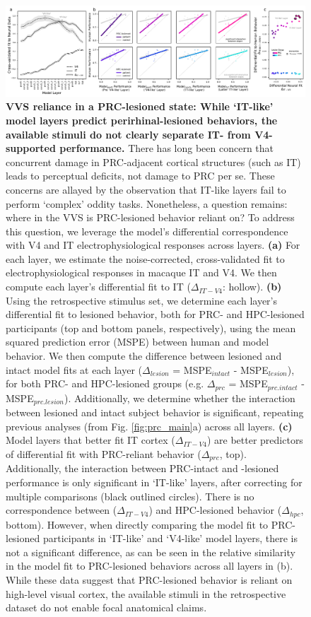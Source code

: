 \documentclass[11pt]{article}
\begin{document}
\begin{figure}[ht]
\centering
\includegraphics[width=\linewidth]{figures/VVSfit_metaanalysis}
\caption{\textbf{VVS reliance in a PRC-lesioned state: While `IT-like' model layers predict perirhinal-lesioned behaviors, the available stimuli do not clearly separate IT- from V4-supported performance.} There has long been concern that concurrent damage in PRC-adjacent cortical structures (such as IT) leads to perceptual deficits, not damage to PRC per se. These concerns are allayed by the observation that IT-like layers fail to perform `complex’ oddity tasks. Nonetheless, a question remains: where in the VVS is PRC-lesioned behavior reliant on? To address this question, we leverage the model's differential correspondence with V4 and IT electrophysiological responses across layers. \textbf{(a)} For each layer, we estimate the noise-corrected, cross-validated fit to electrophysiological responses in macaque IT and V4. We then compute each layer's differential fit to IT ($\Delta_{IT-V4}$: hollow). \textbf{(b)} Using the retrospective stimulus set, we determine each layer's differential fit to lesioned behavior, both for PRC- and HPC-lesioned participants (top and bottom panels, respectively), using the mean squared prediction error (MSPE) between human and model behavior. We then compute the difference between lesioned and intact model fits at each layer ($\Delta_{lesion}$ = MSPE$_{intact}$ - MSPE$_{lesion}$), for both PRC- and HPC-lesioned groups (e.g. $\Delta_{prc}$ = MSPE$_{prc.intact}$ - MSPE$_{prc.lesion}$). Additionally, we determine whether the interaction between lesioned and intact subject behavior is significant, repeating previous analyses (from Fig. \ref{fig:prc_main}a) across all layers. \textbf{(c)} Model layers that better fit IT cortex ($\Delta_{IT-V4}$) are better predictors of differential fit with PRC-reliant behavior ($\Delta_{prc}$, top). Additionally, the interaction between PRC-intact and -lesioned performance is only significant in `IT-like' layers, after correcting for multiple comparisons (black outlined circles). There is no correspondence between ($\Delta_{IT-V4}$) and HPC-lesioned behavior ($\Delta_{hpc}$, bottom). However, when directly comparing the model fit to PRC-lesioned participants in `IT-like' and `V4-like' model layers, there is not a significant difference, as can be seen in the relative similarity in the model fit to PRC-lesioned behaviors across all layers in (b). While these data suggest that PRC-lesioned behavior is reliant on high-level visual cortex, the available stimuli in the retrospective dataset do not enable focal anatomical claims.}
\label{fig:vvs_reliance}
\end{figure}
\end{document}
